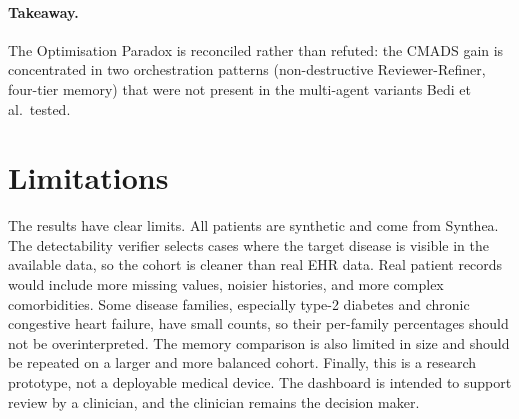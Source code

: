 \paragraph{Takeaway.} The Optimisation Paradox is reconciled rather
than refuted: the CMADS gain is concentrated in two orchestration
patterns (non-destructive Reviewer-Refiner, four-tier memory) that
were not present in the multi-agent variants Bedi et al.\ tested.

\section{Limitations}
\label{sec:discussion_limits}

The results have clear limits. All patients are synthetic and come
from Synthea. The detectability verifier selects cases where the
target disease is visible in the available data, so the cohort is
cleaner than real EHR data. Real patient records would include more
missing values, noisier histories, and more complex comorbidities.
Some disease families, especially type-2 diabetes and chronic
congestive heart failure, have small counts, so their per-family
percentages should not be overinterpreted. The memory comparison is
also limited in size and should be repeated on a larger and more
balanced cohort. Finally, this is a research prototype, not a
deployable medical device. The dashboard is intended to support
review by a clinician, and the clinician remains the decision maker.
